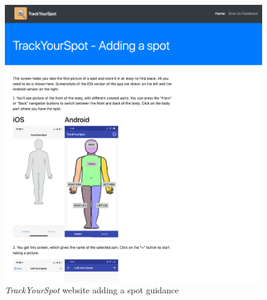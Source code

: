 \begin{figure}
    \includegraphics[width=1\textwidth, center]{figures/webdeployadd.png}
    \caption{\emph{TrackYourSpot} website adding a spot guidance}
    \label{fig:webdeployadd}
\end{figure}


